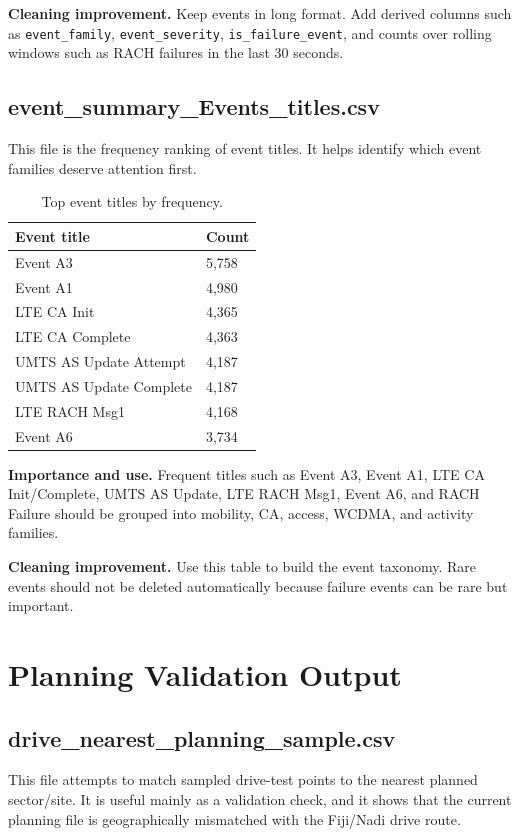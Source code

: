 \documentclass[12pt,a4paper]{article}
\begin{document}
\textbf{Cleaning improvement.} Keep events in long format. Add derived columns such as \texttt{event\_family}, \texttt{event\_severity}, \texttt{is\_failure\_event}, and counts over rolling windows such as RACH failures in the last 30 seconds.


\subsection{event\_summary\_Events\_titles.csv}
This file is the frequency ranking of event titles. It helps identify which event families deserve attention first.


\begin{table}[H]
\centering
\begin{tabularx}{0.92\textwidth}{P{6.5cm}C{2.5cm}}
\toprule
\textbf{Event title} & \textbf{Count} \\
\midrule
{\ttfamily Event A3} & 5,758 \\
{\ttfamily Event A1} & 4,980 \\
{\ttfamily LTE CA Init} & 4,365 \\
{\ttfamily LTE CA Complete} & 4,363 \\
{\ttfamily UMTS AS Update Attempt} & 4,187 \\
{\ttfamily UMTS AS Update Complete} & 4,187 \\
{\ttfamily LTE RACH Msg1} & 4,168 \\
{\ttfamily Event A6} & 3,734 \\
\bottomrule
\end{tabularx}
\caption{Top event titles by frequency.}
\end{table}


\textbf{Importance and use.} Frequent titles such as Event A3, Event A1, LTE CA Init/Complete, UMTS AS Update, LTE RACH Msg1, Event A6, and RACH Failure should be grouped into mobility, CA, access, WCDMA, and activity families.

\textbf{Cleaning improvement.} Use this table to build the event taxonomy. Rare events should not be deleted automatically because failure events can be rare but important.


\section{Planning Validation Output}

\subsection{drive\_nearest\_planning\_sample.csv}
This file attempts to match sampled drive-test points to the nearest planned sector/site. It is useful mainly as a validation check, and it shows that the current planning file is geographically mismatched with the Fiji/Nadi drive route.
\end{document}
